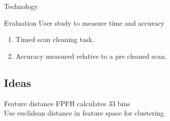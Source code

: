 \documentclass{beamer}
\begin{document}
\begin{frame}{Technology}

\end{frame}

\begin{frame}{Evaluation}
	User study to measure time and accuracy
	\begin{enumerate}
	\item Timed scan cleaning task.
	\item Accuracy measured relative to a pre cleaned scan.
	\end{enumerate}

\end{frame}

\subsection{Ideas}

\begin{frame}{Feature distance}
  FPFH calculates 33 bins\\
  Use euclidean distance in feature space for clustering

\end{frame}
\end{document}
